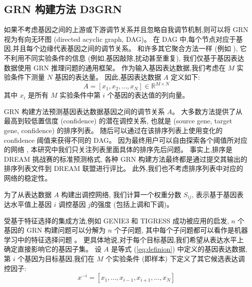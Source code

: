 \subsection{GRN 构建方法 D3GRN}

如果不考虑基因之间的上游或下游调节关系并且忽略自我调节机制,则可以将 GRN 视为有向无环图 (directed acyclic graph, DAG)。
在 DAG 中,每个节点对应于基因,并且每个边缘代表基因之间的调节关系。
和许多其它聚合方法一样 (例如 \cite{huynh2010inferring,Haury2012,slawek2013ennet,ruyssinck2014nimefi,guo2016gene,zheng2019ensemble}),
它不利用不同实验条件的信息 (例如,基因敲除,扰动甚至重复),
我们仅基于基因表达数据使用 GRN 推理问题的通用框架。
作为输入基因表达数据,我们考虑在 $M$ 实验条件下测量 $N$ 基因的表达量。
因此,基因表达数据 $A$ 定义如下:
\begin{equation}
\label{eq:definion}
A = [x_1,x_2,\ldots,x_N] \in \mathbb{R} ^ {M \times N}
\end{equation}
其中 $x_i$ 是所有 $M$ 实验条件中第 $i$ 个基因的表达值的列向量。

GRN 构建方法预测基因表达数据基因之间的调节关系 $A$。
大多数方法提供了从最高到较低置信度 (confidence) 的潜在调控关系,
也就是 (source gene, target gene, confidence) 的排序列表。
随后可以通过在该排序列表上使用变化的 confidence 阈值来获得不同的 DAG。
因为最终用户可以自由探索各个阈值所对应的网络 \cite{slawek2013ennet},
本研究中我们只关注列表里面具体的排序先后问题。
事实上,排序是 DREAM \cite{stolovitzky2007dialogue} 挑战赛的标准预测格式,
各种 GRN 构建方法最终都是通过提交其输出的排序列表文件到 DREAM 联盟进行评比。
此外,我们也不考虑排序列表中对应的网络的稳定性。

为了从表达数据 $A$ 构建出调控网络,
我们计算一个权重分数 $S_{ij}$,
表示基于基因表达水平值上基因 $i$ 调控基因 $j$的强度 (包括上调和下调)。


受基于特征选择的集成方法,例如 GENIE3 \cite{huynh2010inferring} 和 TIGRESS \cite{Haury2012} 成功被应用的启发,
$n$ 个基因的 GRN 构建问题可以分解为 $n$ 个子问题,
其中每个子问题都可以看作是机器学习中的特征选择问题 \cite{nasrabadi2007pattern}。
更具体地说,对于每个目标基因,我们希望从表达水平上确定直接影响它的基因子集。
设 $A$ 是等式 (\ref{eq:definion}) 中定义的基因表达数据,
第 $i$ 个基因为目标基因,我们在 $M$ 个实验条件 (即样本) 下定义了其它候选表达调控因子:
\begin{equation}
  \label{eq:x}
  x^{-i} = [x_1,\ldots,x_{i-1},x_{i+1},\ldots,x_N]
  \end{equation}

